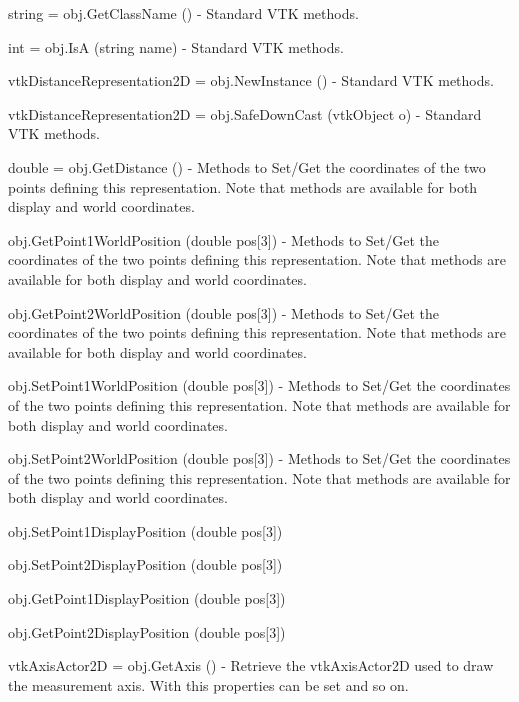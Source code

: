 \begin{DoxyItemize}
\item {\ttfamily string = obj.\-Get\-Class\-Name ()} -\/ Standard V\-T\-K methods.  
\item {\ttfamily int = obj.\-Is\-A (string name)} -\/ Standard V\-T\-K methods.  
\item {\ttfamily vtk\-Distance\-Representation2\-D = obj.\-New\-Instance ()} -\/ Standard V\-T\-K methods.  
\item {\ttfamily vtk\-Distance\-Representation2\-D = obj.\-Safe\-Down\-Cast (vtk\-Object o)} -\/ Standard V\-T\-K methods.  
\item {\ttfamily double = obj.\-Get\-Distance ()} -\/ Methods to Set/\-Get the coordinates of the two points defining this representation. Note that methods are available for both display and world coordinates.  
\item {\ttfamily obj.\-Get\-Point1\-World\-Position (double pos\mbox{[}3\mbox{]})} -\/ Methods to Set/\-Get the coordinates of the two points defining this representation. Note that methods are available for both display and world coordinates.  
\item {\ttfamily obj.\-Get\-Point2\-World\-Position (double pos\mbox{[}3\mbox{]})} -\/ Methods to Set/\-Get the coordinates of the two points defining this representation. Note that methods are available for both display and world coordinates.  
\item {\ttfamily obj.\-Set\-Point1\-World\-Position (double pos\mbox{[}3\mbox{]})} -\/ Methods to Set/\-Get the coordinates of the two points defining this representation. Note that methods are available for both display and world coordinates.  
\item {\ttfamily obj.\-Set\-Point2\-World\-Position (double pos\mbox{[}3\mbox{]})} -\/ Methods to Set/\-Get the coordinates of the two points defining this representation. Note that methods are available for both display and world coordinates.  
\item {\ttfamily obj.\-Set\-Point1\-Display\-Position (double pos\mbox{[}3\mbox{]})}  
\item {\ttfamily obj.\-Set\-Point2\-Display\-Position (double pos\mbox{[}3\mbox{]})}  
\item {\ttfamily obj.\-Get\-Point1\-Display\-Position (double pos\mbox{[}3\mbox{]})}  
\item {\ttfamily obj.\-Get\-Point2\-Display\-Position (double pos\mbox{[}3\mbox{]})}  
\item {\ttfamily vtk\-Axis\-Actor2\-D = obj.\-Get\-Axis ()} -\/ Retrieve the vtk\-Axis\-Actor2\-D used to draw the measurement axis. With this properties can be set and so on.  

\end{DoxyItemize}
